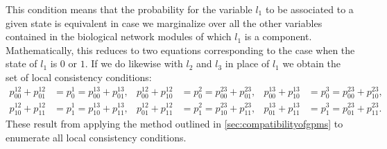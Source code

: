 This condition means that the probability for the variable $l_1$ to be associated to a given state is equivalent in case we marginalize over all the other variables contained in the biological network modules of which $l_1$ is a component.  Mathematically, this reduces to two equations corresponding to the case when the state of $l_1$ is $0$ or $1$. If we do likewise with $l_2$ and $l_3$ in place of $l_1$ we obtain the set of local consistency conditions:
\begin{equation}
\begin{aligned}\label{eq:localconsistencythreegenes}
 p^{12}_{00} + p^{12}_{01} &= p^{1}_0 = p^{13}_{00} + p^{13}_{01}, &
 p^{12}_{00} + p^{12}_{10} &= p^{2}_0 = p^{23}_{00} + p^{23}_{01}, &
 p^{13}_{00} + p^{13}_{10} &= p^{3}_0 = p^{23}_{00} + p^{23}_{10},\\
 p^{12}_{10} + p^{12}_{11} &= p^{1}_1 = p^{13}_{10} + p^{13}_{11}, &
 p^{12}_{01} + p^{12}_{11} &= p^{2}_1 = p^{23}_{10} + p^{23}_{11}, &
 p^{13}_{01} + p^{13}_{11} &= p^{3}_1 = p^{23}_{01} + p^{23}_{11}.
 \end{aligned}
 \end{equation}
These result from applying the method outlined in \ref{sec:compatibilityofgpms} to enumerate all local consistency conditions.
